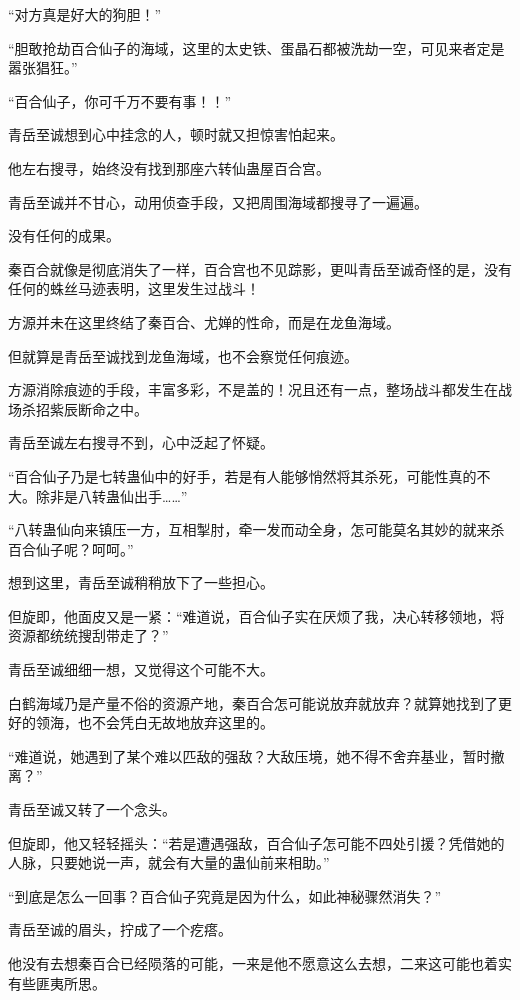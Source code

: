 \begin{this_body}
“对方真是好大的狗胆！”

“胆敢抢劫百合仙子的海域，这里的太史铁、蛋晶石都被洗劫一空，可见来者定是嚣张猖狂。”

“百合仙子，你可千万不要有事！！”

青岳至诚想到心中挂念的人，顿时就又担惊害怕起来。

他左右搜寻，始终没有找到那座六转仙蛊屋百合宫。

青岳至诚并不甘心，动用侦查手段，又把周围海域都搜寻了一遍遍。

没有任何的成果。

秦百合就像是彻底消失了一样，百合宫也不见踪影，更叫青岳至诚奇怪的是，没有任何的蛛丝马迹表明，这里发生过战斗！

方源并未在这里终结了秦百合、尤婵的性命，而是在龙鱼海域。

但就算是青岳至诚找到龙鱼海域，也不会察觉任何痕迹。

方源消除痕迹的手段，丰富多彩，不是盖的！况且还有一点，整场战斗都发生在战场杀招紫辰断命之中。

青岳至诚左右搜寻不到，心中泛起了怀疑。

“百合仙子乃是七转蛊仙中的好手，若是有人能够悄然将其杀死，可能性真的不大。除非是八转蛊仙出手……”

“八转蛊仙向来镇压一方，互相掣肘，牵一发而动全身，怎可能莫名其妙的就来杀百合仙子呢？呵呵。”

想到这里，青岳至诚稍稍放下了一些担心。

但旋即，他面皮又是一紧：“难道说，百合仙子实在厌烦了我，决心转移领地，将资源都统统搜刮带走了？”

青岳至诚细细一想，又觉得这个可能不大。

白鹤海域乃是产量不俗的资源产地，秦百合怎可能说放弃就放弃？就算她找到了更好的领海，也不会凭白无故地放弃这里的。

“难道说，她遇到了某个难以匹敌的强敌？大敌压境，她不得不舍弃基业，暂时撤离？”

青岳至诚又转了一个念头。

但旋即，他又轻轻摇头：“若是遭遇强敌，百合仙子怎可能不四处引援？凭借她的人脉，只要她说一声，就会有大量的蛊仙前来相助。”

“到底是怎么一回事？百合仙子究竟是因为什么，如此神秘骤然消失？”

青岳至诚的眉头，拧成了一个疙瘩。

他没有去想秦百合已经陨落的可能，一来是他不愿意这么去想，二来这可能也着实有些匪夷所思。


\end{this_body}
